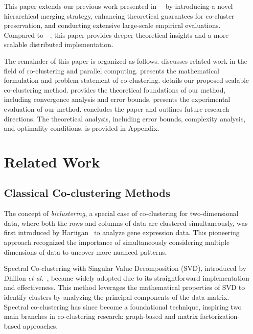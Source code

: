 \documentclass[journal]{IEEEtran}
\renewcommand{\cite}[1]{~\autocite{#1}}
\begin{document}
This paper extends our previous work presented in~\cite{wu2024ScalableCoClusteringLargeScale} by introducing a novel hierarchical merging strategy, enhancing theoretical guarantees for co-cluster preservation, and conducting extensive large-scale empirical evaluations. Compared to~\cite{wu2024ScalableCoClusteringLargeScale}, this paper provides deeper theoretical insights and a more scalable distributed implementation.

The remainder of this paper is organized as follows.  discusses related work in the field of co-clustering and parallel computing.  presents the mathematical formulation and problem statement of co-clustering.  details our proposed scalable co-clustering method.  provides the theoretical foundations of our method, including convergence analysis and error bounds.  presents the experimental evaluation of our method.  concludes the paper and outlines future research directions. The theoretical analysis, including error bounds, complexity analysis, and optimality conditions, is provided in Appendix.

\section{Related Work}
\label{sec:related-work}
\subsection{Classical Co-clustering Methods}
The concept of \emph{biclustering}, a special case of co-clustering for two-dimensional data, where both the rows and columns of data are clustered simultaneously, was first introduced by Hartigan\cite{hartigan1972DirectClusteringData} to analyze gene expression data. This pioneering approach recognized the importance of simultaneously considering multiple dimensions of data to uncover more nuanced patterns.

Spectral Co-clustering with Singular Value Decomposition (SVD), introduced by Dhillon \textit{et al.}\cite{dhillon2001CoclusteringDocumentsWords}, became widely adopted due to its straightforward implementation and effectiveness. This method leverages the mathematical properties of SVD to identify clusters by analyzing the principal components of the data matrix. Spectral co-clustering has since become a foundational technique, inspiring two main branches in co-clustering research: graph-based and matrix factorization-based approaches.
\end{document}
